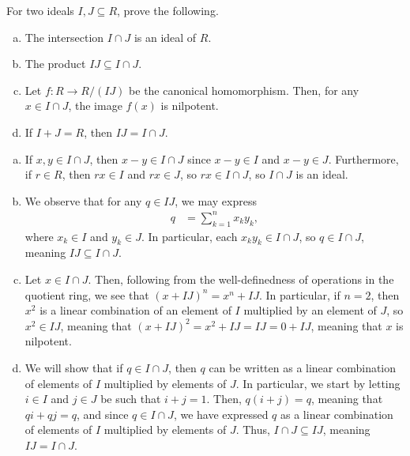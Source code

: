 \documentclass[10pt]{mypackage}
\begin{document}
\RaggedRight
\begin{problem}[Problem 1]
  For two ideals $I,J\subseteq R$, prove the following.
  \begin{enumerate}[(a)]
    \item The intersection $I\cap J$ is an ideal of $R$.
    \item The product $IJ\subseteq I\cap J$.
    \item Let $f\colon R\rightarrow R/(IJ)$ be the canonical homomorphism. Then, for any $x\in I\cap J$, the image $f(x)$ is nilpotent.
    \item If $I + J = R$, then $IJ = I\cap J$.
  \end{enumerate}
\end{problem}
\begin{solution}\hfill
  \begin{enumerate}[(a)]
    \item If $x,y\in I\cap J$, then $x - y\in I\cap J$ since $x-y\in I$ and $x-y\in J$. Furthermore, if $r\in R$, then $rx\in I$ and $rx\in J$, so $rx\in I\cap J$, so $I\cap J$ is an ideal.
    \item We observe that for any $q\in IJ$, we may express
      \begin{align*}
        q &= \sum_{k=1}^{n}x_ky_k,
      \end{align*}
      where $x_k\in I$ and $y_k\in J$. In particular, each $x_ky_k\in I\cap J$, so $q\in I\cap J$, meaning $IJ\subseteq I\cap J$.
    \item Let $x\in I\cap J$. Then, following from the well-definedness of operations in the quotient ring, we see that $\left( x+IJ \right)^{n} = x^{n} + IJ$. In particular, if $n = 2$, then $x^2$ is a linear combination of an element of $I$ multiplied by an element of $J$, so $x^2\in IJ$, meaning that $\left( x + IJ \right)^{2} = x^2 + IJ = IJ = 0 + IJ$, meaning that $x$ is nilpotent.
    \item We will show that if $q\in I\cap J$, then $q$ can be written as a linear combination of elements of $I$ multiplied by elements of $J$. In particular, we start by letting $i\in I$ and $j\in J$ be such that $i + j = 1$. Then, $q\left( i+j \right) = q$, meaning that $qi + qj = q$, and since $q\in I\cap J$, we have expressed $q$ as a linear combination of elements of $I$ multiplied by elements of $J$. Thus, $I\cap J \subseteq IJ$, meaning $IJ = I\cap J$.
  \end{enumerate}
\end{solution}
\end{document}
